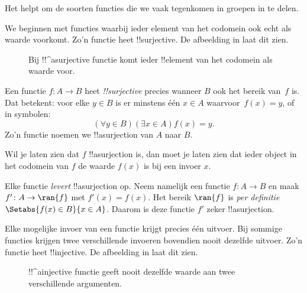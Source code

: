 \documentclass[../../../include/open-logic-section]{subfiles}
\begin{document}

\begin{explain}
Het helpt om de soorten functies die we vaak tegenkomen in groepen in
te delen.

We beginnen met functies waarbij ieder element van het codomein ook
echt als waarde voorkomt. Zo'n functie heet !!{surjective}. De
afbeelding in  laat dit zien.

\begin{figure}
  \caption{Bij !!^a{surjective} functie komt ieder !!{element} van het
    codomein als waarde voor.}
\end{figure}
\end{explain}

\begin{defn}
Een functie $f \colon A \rightarrow B$ heet \emph{!!{surjective}}
precies wanneer $B$ ook het bereik van~$f$ is. Dat betekent: voor elke
$y \in B$ is er minstens één $x \in A$ waarvoor~$f(x) = y$, of in
symbolen:
\[
  (\forall y \in B)(\exists x \in A)f(x) = y.
\]
Zo'n functie noemen we !!a{surjection} van $A$ naar $B$.
\end{defn}

\begin{explain}
Wil je laten zien dat $f$ !!a{surjection} is, dan moet je laten zien
dat ieder object in het codomein van $f$ de waarde $f(x)$ is bij een
invoer $x$.

Elke functie \emph{levert} !!a{surjection} op. Neem namelijk een
functie $f \colon A \to B$ en maak $f' \colon A \to \ran{f}$ met
$f'(x) = f(x)$. Het bereik $\ran{f}$ is \emph{per definitie}
$\Setabs{f(x) \in B}{x \in A}$. Daarom is deze functie $f'$ zeker
!!a{surjection}.
\end{explain}

\begin{explain}
Elke mogelijke invoer van een functie krijgt precies één uitvoer. Bij
sommige functies krijgen twee verschillende invoeren bovendien nooit
dezelfde uitvoer. Zo'n functie heet !!{injective}. De afbeelding in
 laat dit zien.
\begin{figure}
  \caption{!!^a{injective} functie geeft nooit dezelfde waarde aan
    twee verschillende argumenten.}
\end{figure}
\end{explain}
\end{document}

